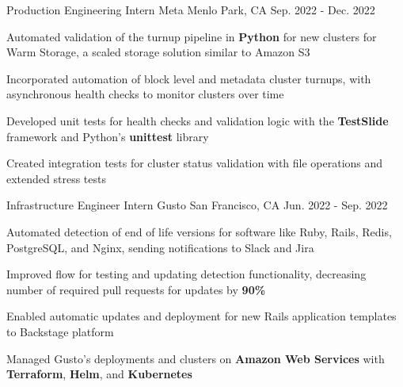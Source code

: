 

\begin{cventries}

\cventry
{Production Engineering Intern} %
{Meta} %
{Menlo Park, CA} %
{Sep. 2022 - Dec. 2022} %
{
  \begin{cvitems} %
    \item {Automated validation of the turnup pipeline in \textbf{Python} for new clusters for Warm Storage, a scaled storage solution similar to Amazon S3}
    \item {Incorporated automation of block level and metadata cluster turnups, with asynchronous health checks to monitor clusters over time}
    \item {Developed unit tests for health checks and validation logic with the \textbf{TestSlide} framework and Python's \textbf{unittest} library}
    \item {Created integration tests for cluster status validation with file operations and extended stress tests}
  \end{cvitems}
}

\cventry
{Infrastructure Engineer Intern} %
{Gusto} %
{San Francisco, CA} %
{Jun. 2022 - Sep. 2022} %
{
  \begin{cvitems} %
    \item {Automated detection of end of life versions for software like Ruby, Rails, Redis, PostgreSQL, and Nginx, sending notifications to Slack and Jira}
    \item {Improved flow for testing and updating detection functionality, decreasing number of required pull requests for updates by \textbf{90\%}}
    \item {Enabled automatic updates and deployment for new Rails application templates to Backstage platform}
    \item {Managed Gusto's deployments and clusters on \textbf{Amazon Web Services} with \textbf{Terraform}, \textbf{Helm}, and \textbf{Kubernetes}}
  \end{cvitems}
}


\end{cventries}
